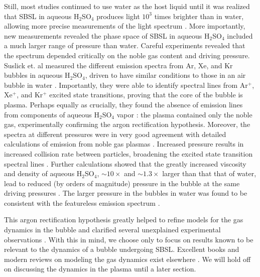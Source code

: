 \documentclass[prb,aps,nofootinbib,superscriptaddress,floatfix]{revtex4-2}
\begin{document}
Still, most studies continued to use water as the host liquid until it was realized that SBSL in aqueous H$_2$SO$_4$ produces light $10^3$ times brighter than in water, allowing more precise measurements of the light spectrum \cite{}. More importantly, new measurements revealed the phase space of SBSL in aqueous H$_2$SO$_4$ included a much larger range of pressure than water. Careful experiments revealed that the spectrum depended critically on the noble gas content and driving pressure. Suslick et. al measured the different emission spectra from Ar, Xe, and Kr bubbles in aqueous H$_2$SO$_4$, driven to have similar conditions to those in an air bubble in water \cite{flannigan2005plasma,flannigan2006measurement,suslick2008inside}. Importantly, they were able to identify spectral lines from Ar$^+$, Xe$^+$, and Kr$^+$ excited state transitions, proving that the core of the bubble is plasma. Perhaps equally as crucially, they found the absence of emission lines from components of aqueous H$_2$SO$_4$ vapor \cite{suslick2008inside,flannigan2006measurement,flannigan2006measurement}: the plasma contained only the noble gas, experimentally confirming the argon rectification hypothesis. Moreover, the spectra at different pressures were in very good agreement with detailed calculations of emission from noble gas plasmas \cite{an2009diagnosing,an2008spectral}. Increased pressure results in increased collision rate between particles, broadening the excited state transition spectral lines \cite{an2008spectral,suslick2008inside,flannigan2005plasma,flannigan2006measurement}. Further calculations showed that the greatly increased viscosity and density of aqueous H$_2$SO$_4$, $\sim 10 \times$ and $\sim 1.3 \times$ larger than that that of water, lead to reduced (by orders of magnitude) pressure in the bubble at the same driving pressures \cite{an2009diagnosing}. The larger pressure in the bubbles in water was found to be consistent with the featureless emission spectrum \cite{suslick2008inside,yasui2018acoustic}.

This argon rectification hypothesis greatly helped to refine models for the gas dynamics in the bubble and clarified several unexplained experimental observations \cite{suslick2008inside,brenner2002single}. With this in mind, we choose only to focus on results known to be relevant to the dynamics of a bubble undergoing SBSL. Excellent books and modern reviews on modeling the gas dynamics exist elsewhere \cite{brenner2002single,yasui2018acoustic,brennen2014cavitation}. We will hold off on discussing the dynamics in the plasma until a later section. 
\end{document}
